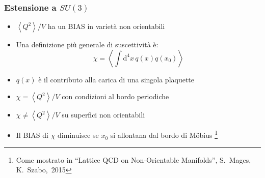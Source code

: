 \begin{frame}
    \begin{center}
    \end{center}
\end{frame}

\begin{frame}
    \frametitle{Estensione a $SU(3)$}
    \begin{itemize}
        \item $\left<Q^2\right>/V$ ha un BIAS in varietà non orientabili
        \item Una definizione più generale di suscettività è:
            $$\chi = \left<\int\mathrm d^4x\,q(x)q(x_0)\right>$$
        \item $q(x)$ è il contributo alla carica di una singola plaquette
        \item $\chi = \left<Q^2\right>/V$ con condizioni al bordo periodiche
        \item $\chi \neq \left<Q^2\right>/V$ su superfici non orientabili
        \item Il BIAS di $\chi$ diminuisce se $x_0$ si allontana dal bordo di M\"obius%
            \footnote{Come mostrato in ``Lattice QCD on Non-Orientable Manifolds'', %
            \mbox{S. Mages}, \mbox{K. Szabo, 2015}}
    \end{itemize}
\end{frame}

